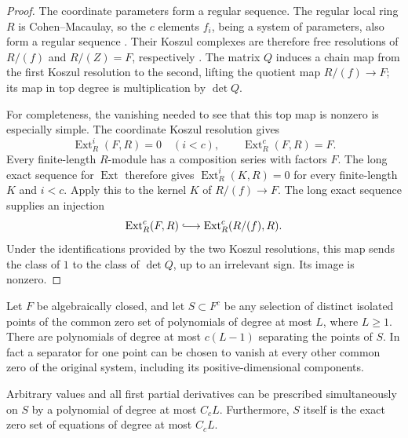 \begin{proof}
The coordinate parameters form a regular sequence.  The regular local ring $R$ is Cohen--Macaulay, so the $c$ elements $f_i$, being a system of parameters, also form a regular sequence \cite[Tags~00OQ, 00NQ, and 02JN]{stacksproject}.  Their Koszul complexes are therefore free resolutions of $R/(f)$ and $R/(Z)=F$, respectively \cite[Tag~062F]{stacksproject}. The matrix $Q$ induces a chain map from the first Koszul resolution to the second, lifting the quotient map $R/(f)\longrightarrow F$; its map in top degree is multiplication by $\det Q$.

For completeness, the vanishing needed to see that this top map is nonzero is especially simple.  The coordinate Koszul resolution gives
\[
 \operatorname{Ext}^i_R(F,R)=0\quad(i<c),\qquad
 \operatorname{Ext}^c_R(F,R)=F.
\]
Every finite-length $R$-module has a composition series with factors $F$.  The long exact sequence for $\operatorname{Ext}$ therefore gives $\operatorname{Ext}^i_R(K,R)=0$ for every finite-length $K$ and $i<c$. Apply this to the kernel $K$ of $R/(f)\longrightarrow F$.  The long exact sequence supplies an injection
\[
 \operatorname{Ext}^c_R(F,R)\lhook\joinrel\longrightarrow
       \operatorname{Ext}^c_R(R/(f),R).
\]
Under the identifications provided by the two Koszul resolutions, this map sends the class of $1$ to the class of $\det Q$, up to an irrelevant sign.  Its image is nonzero.
\end{proof}

\begin{lemma}
\label{lem:poly-interpolation}
Let $F$ be algebraically closed, and let $S\subset F^c$ be any selection of distinct isolated points of the common zero set of polynomials of degree at most $L$, where $L\ge1$.  There are polynomials of degree at most $c(L-1)$ separating the points of $S$.  In fact a separator for one point can be chosen to vanish at every other common zero of the original system, including its positive-dimensional components.

Arbitrary values and all first partial derivatives can be prescribed simultaneously on $S$ by a polynomial of degree at most $C_cL$. Furthermore, $S$ itself is the exact zero set of equations of degree at most $C_cL$.
\end{lemma}

